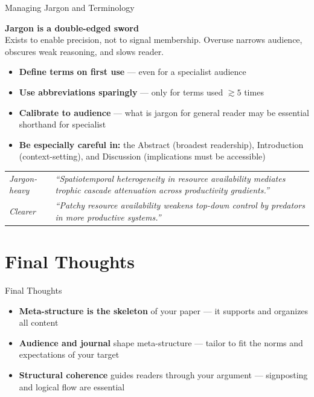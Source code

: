 \documentclass{beamer}
\begin{document}
\begin{frame}{Managing Jargon and Terminology}

  \footnotesize
  \textbf{Jargon is a double-edged sword} \\
  Exists to enable precision, not to signal membership. 
  Overuse narrows audience, obscures weak reasoning,
  and slows reader.

  \medskip
  \begin{itemize}
    \item \textbf{Define terms on first use} --- even for a
      specialist audience
    \item \textbf{Use abbreviations sparingly} --- only
      for terms used $\gtrsim 5$ times
    \item \textbf{Calibrate to audience} --- what is jargon
      for general reader may be essential shorthand for
      specialist
    \item \textbf{Be especially careful in:} the Abstract (broadest
      readership), Introduction (context-setting), and Discussion
      (implications must be accessible)
  \end{itemize}

  \medskip
  {\scriptsize
  \begin{tabular}{@{}lp{7.5cm}@{}}
    \hline
    \textit{Jargon-heavy} & \textit{``Spatiotemporal heterogeneity
      in resource availability mediates trophic cascade attenuation
      across productivity gradients.''} \\
    \textit{Clearer} & \textit{``Patchy resource availability weakens
      top-down control by predators in more productive systems.''} \\
    \hline
  \end{tabular}
  }

\end{frame}

\section{Final Thoughts}
\begin{frame}{Final Thoughts}

  \begin{itemize}
    \item \textbf{Meta-structure is the skeleton} of your paper ---
      it supports and organizes all content
    \item \textbf{Audience and journal} shape meta-structure ---
      tailor to fit the norms and expectations of your target
    \item \textbf{Structural coherence} guides readers through your
      argument --- signposting and logical flow are essential
  \end{itemize}
\end{frame}
\end{document}
